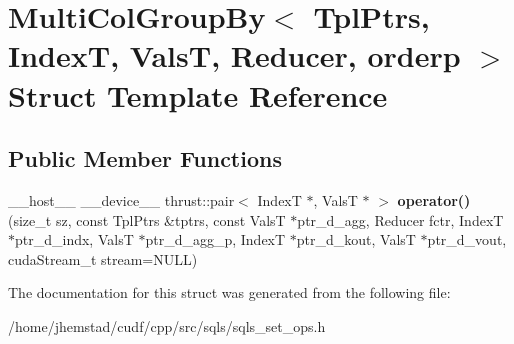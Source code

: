 \hypertarget{structMultiColGroupBy}{}\section{Multi\+Col\+Group\+By$<$ Tpl\+Ptrs, IndexT, ValsT, Reducer, orderp $>$ Struct Template Reference}
\label{structMultiColGroupBy}
\subsection*{Public Member Functions}
\begin{DoxyCompactItemize}
\item 
\+\_\+\+\_\+host\+\_\+\+\_\+ \+\_\+\+\_\+device\+\_\+\+\_\+ thrust\+::pair$<$ IndexT $\ast$, ValsT $\ast$ $>$ {\bfseries operator()} (size\+\_\+t sz, const Tpl\+Ptrs \&tptrs, const ValsT $\ast$ptr\+\_\+d\+\_\+agg, Reducer fctr, IndexT $\ast$ptr\+\_\+d\+\_\+indx, ValsT $\ast$ptr\+\_\+d\+\_\+agg\+\_\+p, IndexT $\ast$ptr\+\_\+d\+\_\+kout, ValsT $\ast$ptr\+\_\+d\+\_\+vout, cuda\+Stream\+\_\+t stream=N\+U\+LL)\hypertarget{structMultiColGroupBy_a43d290591fa10270cc5790224d5ca4dd}{}\label{structMultiColGroupBy_a43d290591fa10270cc5790224d5ca4dd}

\end{DoxyCompactItemize}


The documentation for this struct was generated from the following file\+:\begin{DoxyCompactItemize}
\item 
/home/jhemstad/cudf/cpp/src/sqls/sqls\+\_\+set\+\_\+ops.\+h\end{DoxyCompactItemize}
